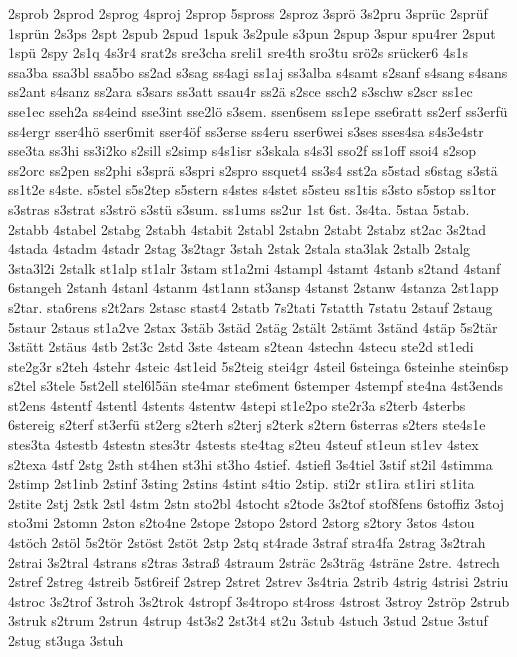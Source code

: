 {2sprob
2sprod
2sprog
4sproj
2sprop
5spross
2sproz
3sprö
3s2pru
3sprüc
2sprüf
1sprün
2s3ps
2spt
2spub
2spud
1spuk
3s2pule
s3pun
2spup
3spur
spu4rer
2sput
1spü
2spy
2s1q
4s3r4
srat2s
sre3cha
sreli1
sre4th
sro3tu
srö2s
srücker6
4s1s
ssa3ba
ssa3bl
ssa5bo
ss2ad
s3sag
ss4agi
ss1aj
ss3alba
s4samt
s2sanf
s4sang
s4sans
ss2ant
s4sanz
ss2ara
s3sars
ss3att
ssau4r
ss2ä
s2sce
ssch2
s3schw
s2scr
ss1ec
sse1ec
sseh2a
ss4eind
sse3int
sse2lö
s3sem.
ssen6sem
ss1epe
sse6ratt
ss2erf
ss3erfü
ss4ergr
sser4hö
sser6mit
sser4öf
ss3erse
ss4eru
sser6wei
s3ses
sses4sa
s4s3e4str
sse3ta
ss3hi
ss3i2ko
s2sill
s2simp
s4s1isr
s3skala
s4s3l
sso2f
ss1off
ssoi4
s2sop
ss2orc
ss2pen
ss2phi
s3sprä
s3spri
s2spro
ssquet4
ss3s4
sst2a
s5stad
s6stag
s3stä
ss1t2e
s4ste.
s5stel
s5s2tep
s5stern
s4stes
s4stet
s5steu
ss1tis
s3sto
s5stop
ss1tor
s3stras
s3strat
s3strö
s3stü
s3sum.
ss1ums
ss2ur
1st
6st.
3s4ta.
5staa
5stab.
2stabb
4stabel
2stabg
2stabh
4stabit
2stabl
2stabn
2stabt
2stabz
st2ac
3s2tad
4stada
4stadm
4stadr
2stag
3s2tagr
3stah
2stak
2stala
sta3lak
2stalb
2stalg
3sta3l2i
2stalk
st1alp
st1alr
3stam
st1a2mi
4stampl
4stamt
4stanb
s2tand
4stanf
6stangeh
2stanh
4stanl
4stanm
4st1ann
st3ansp
4stanst
2stanw
4stanza
2st1app
s2tar.
sta6rens
s2t2ars
2stasc
stast4
2statb
7s2tati
7statth
7statu
2stauf
2staug
5staur
2staus
st1a2ve
2stax
3stäb
3städ
2stäg
2stält
2stämt
3ständ
4stäp
5s2tär
3stätt
2stäus
4stb
2st3c
2std
3ste
4steam
s2tean
4stechn
4stecu
ste2d
st1edi
ste2g3r
s2teh
4stehr
4steic
4st1eid
5s2teig
stei4gr
4steil
6steinga
6steinhe
stein6sp
s2tel
s3tele
5st2ell
stel6l5än
ste4mar
ste6ment
6stemper
4stempf
ste4na
4st3ends
st2ens
4stentf
4stentl
4stents
4stentw
4stepi
st1e2po
ste2r3a
s2terb
4sterbs
6stereig
s2terf
st3erfü
st2erg
s2terh
s2terj
s2terk
s2tern
6sterras
s2ters
ste4s1e
stes3ta
4stestb
4stestn
stes3tr
4stests
ste4tag
s2teu
4steuf
st1eun
st1ev
4stex
s2texa
4stf
2stg
2sth
st4hen
st3hi
st3ho
4stief.
4stiefl
3s4tiel
3stif
st2il
4stimma
2stimp
2st1inb
2stinf
3sting
2stins
4stint
s4tio
2stip.
sti2r
st1ira
st1iri
st1ita
2stite
2stj
2stk
2stl
4stm
2stn
sto2bl
4stocht
s2tode
3s2tof
stof8fens
6stoffiz
3stoj
sto3mi
2stomn
2ston
s2to4ne
2stope
2stopo
2stord
2storg
s2tory
3stos
4stou
4stöch
2stöl
5s2tör
2stöst
2stöt
2stp
2stq
st4rade
3straf
stra4fa
2strag
3s2trah
2strai
3s2tral
4strans
s2tras
3straß
4straum
2sträc
2s3träg
4sträne
2stre.
4strech
2stref
2streg
4streib
5st6reif
2strep
2stret
2strev
3s4tria
2strib
4strig
4strisi
2striu
4stroc
3s2trof
3stroh
3s2trok
4stropf
3s4tropo
st4ross
4strost
3stroy
2ströp
2strub
3struk
s2trum
2strun
4strup
4st3s2
2st3t4
st2u
3stub
4stuch
3stud
2stue
3stuf
2stug
st3uga
3stuh
}
